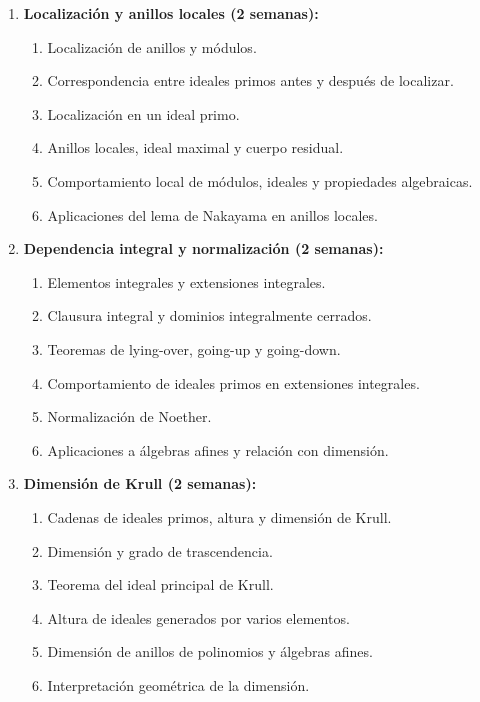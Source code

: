 \begin{refsection}
\begin{enumerate}
\item \textbf{Localización y anillos locales (2 semanas):}
\begin{enumerate}
    \item Localización de anillos y módulos.
    \item Correspondencia entre ideales primos antes y después de localizar.
    \item Localización en un ideal primo.
    \item Anillos locales, ideal maximal y cuerpo residual.
    \item Comportamiento local de módulos, ideales y propiedades algebraicas.
    \item Aplicaciones del lema de Nakayama en anillos locales.
\end{enumerate}

\item \textbf{Dependencia integral y normalización (2 semanas):}
\begin{enumerate}
    \item Elementos integrales y extensiones integrales.
    \item Clausura integral y dominios integralmente cerrados.
    \item Teoremas de lying-over, going-up y going-down.
    \item Comportamiento de ideales primos en extensiones integrales.
    \item Normalización de Noether.
    \item Aplicaciones a álgebras afines y relación con dimensión.
\end{enumerate}

\item \textbf{Dimensión de Krull (2 semanas):}
\begin{enumerate}
    \item Cadenas de ideales primos, altura y dimensión de Krull.
    \item Dimensión y grado de trascendencia.
    \item Teorema del ideal principal de Krull.
    \item Altura de ideales generados por varios elementos.
    \item Dimensión de anillos de polinomios y álgebras afines.
    \item Interpretación geométrica de la dimensión.
\end{enumerate}


\end{enumerate}
\end{refsection}

